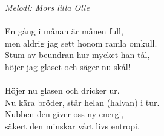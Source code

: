 {\footnotesize\textit{Melodi: Mors lilla Olle}}\\
\\
En gång i månan är månen full,\\
men aldrig jag sett honom ramla omkull.\\
Stum av beundran hur mycket han tål,\\
höjer jag glaset och säger nu skål!\\
\\
Höjer nu glasen och dricker ur.\\
Nu kära bröder, står helan (halvan) i tur.\\
Nubben den giver oss ny energi,\\
säkert den minskar vårt livs entropi.
